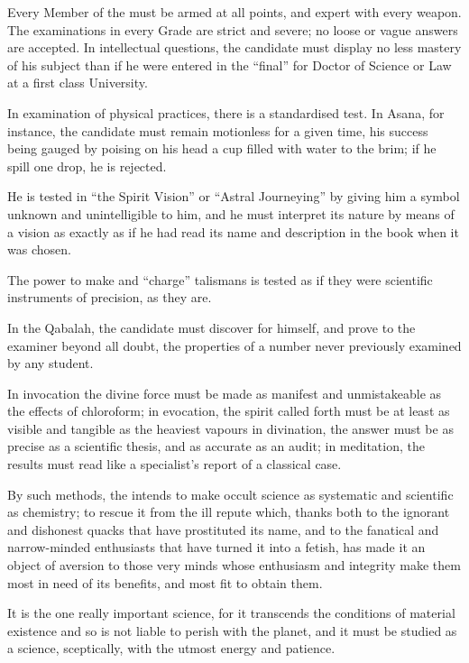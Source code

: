 Every Member of the \Argentium{} must be armed at all points, and expert with every weapon. The examinations in every Grade are strict and severe; no loose or vague answers are accepted. In intellectual questions, the candidate must display no less mastery of his subject than if he were entered in the \enquote{final} for Doctor of Science or Law at a first class University.

In examination of physical practices, there is a standardised test.  In Asana, for instance, the candidate must remain motionless for a given time, his success being gauged by poising on his head a cup filled with water to the brim; if he spill one drop, he is rejected.

He is tested in \enquote{the Spirit Vision} or \enquote{Astral Journeying} by giving him a symbol unknown and unintelligible to him, and he must interpret its nature by means of a vision as exactly as if he had read its name and description in the book when it was chosen.

The power to make and \enquote{charge} talismans is tested as if they were scientific instruments of precision, as they are.

In the Qabalah, the candidate must discover for himself, and prove to the examiner beyond all doubt, the properties of a number never previously examined by any student.

In invocation the divine force must be made as manifest and unmistakeable as the effects of chloroform; in evocation, the spirit called forth must be at least as visible and tangible as the heaviest vapours in divination, the answer must be as precise as a scientific thesis, and as accurate as an audit; in meditation, the results must read like a specialist's report of a classical case.

By such methods, the \Argentium{} intends to make occult science as systematic and scientific as chemistry; to rescue it from the ill repute which, thanks both to the ignorant and dishonest quacks that have prostituted its name, and to the fanatical and narrow-minded enthusiasts that have turned it into a fetish, has made it an object of aversion to those very minds whose enthusiasm and integrity make them most in need of its benefits, and most fit to obtain them.

It is the one really important science, for it transcends the conditions of material existence and so is not liable to perish with the planet, and it must be studied as a science, sceptically, with the utmost energy and patience.


